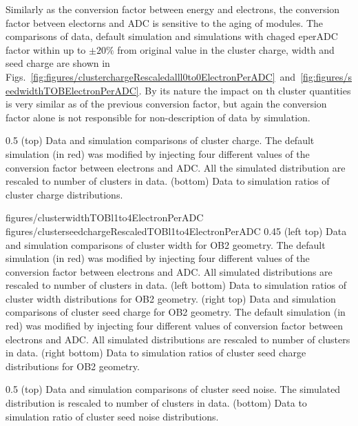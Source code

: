 Similarly as the conversion factor between energy and electrons, the conversion factor betveen electorns and ADC is sensitive to the aging of modules. The comparisons of data, default simulation and simulations with chaged eperADC factor within up to  $\pm 20\%$ from original value in the cluster charge, width and seed charge are shown in Figs.~\ref{fig:figures/clusterchargeRescaledalll0to0ElectronPerADC}~and~\ref{fig:figures/seedwidthTOBElectronPerADC}. By its nature the impact on th cluster quantities is very similar as of the previous conversion factor, but again the conversion factor alone is not responsible for non-description of data by simulation.  


                 {0.5}       %
                 { (top) Data and simulation comparisons of cluster charge. The default simulation (in red) was modified by injecting four different values of the conversion factor between electrons and ADC. All the simulated distribution are rescaled to number of clusters in data. (bottom) Data to simulation ratios of cluster charge distributions. }

                 {figures/clusterwidthTOBl1to4ElectronPerADC}
                 {figures/clusterseedchargeRescaledTOBl1to4ElectronPerADC} %
                 {0.45}       %
                 {(left top) Data and simulation  comparisons of cluster width for OB2 geometry. The default simulation (in red) was modified by injecting four different values of the conversion factor between electrons and ADC. All simulated distributions are rescaled to number of clusters in data. (left bottom) Data to simulation ratios of cluster width distributions for OB2 geometry. (right top) Data and simulation  comparisons of cluster seed charge for OB2 geometry. The default simulation (in red) was modified by injecting four different values of conversion factor between electrons and ADC. All simulated distributions are rescaled to number of clusters in data. (right bottom) Data to simulation ratios of cluster seed charge distributions for OB2 geometry. }

                 {0.5}       %
                 { (top) Data and simulation comparisons of cluster seed noise. The simulated distribution is rescaled to number of clusters in data. (bottom) Data to simulation ratio of cluster seed noise distributions. }

